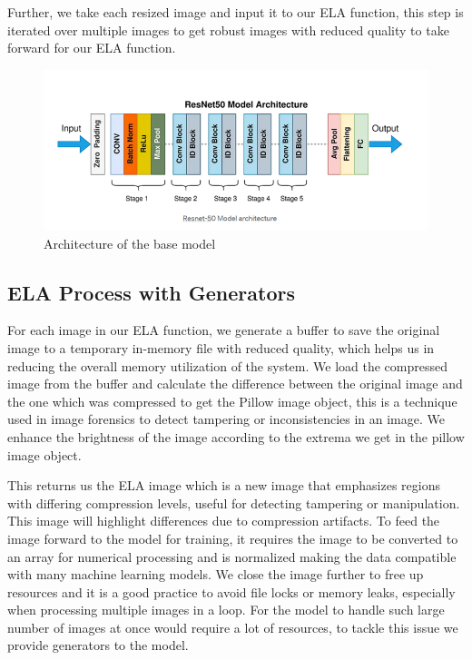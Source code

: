 \documentclass{ieeeaccess}
\begin{document}
Further, we take each resized image and input it to our ELA function, this step is iterated over multiple images to get robust images with reduced quality  to take forward for our ELA function.

\begin{figure}
	\centering
	\includegraphics[width=\linewidth]{Base_Model.png}
	\caption{ Architecture of the base model}
	\label{base-model}
\end{figure} 

\subsection{ELA Process with Generators}
For each image in our ELA function, we generate a buffer to save the original image to a temporary in-memory file with reduced quality, which helps us in reducing the overall memory utilization of the system. We load the compressed image from the buffer and calculate the difference between the original image and the one which was compressed to get the Pillow image object, this is a technique used in image forensics to detect tampering or inconsistencies in an image. We enhance the brightness of the image according to the extrema we get in the pillow image object. 

This returns us the ELA image which is a new image that emphasizes regions with differing compression levels, useful for detecting tampering or manipulation. This image will highlight differences due to compression artifacts. To feed the image forward to the model for training, it requires the image to be converted to an array for numerical processing and is normalized making the data compatible with many machine learning models. We close the image further to free up resources and it is a good practice to avoid file locks or memory leaks, especially when processing multiple images in a loop. For the model to handle such large number of images at once would require a lot of resources, to tackle this issue we provide generators to the model.
\end{document}
